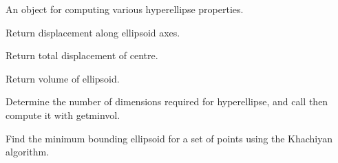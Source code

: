 \documentclass[a4paper,10pt,openany, oneside]{sphinxmanual}
\begin{document}
\begin{fulllineitems}
\label{api_reference:distellipsoid.ellipsoid.Ellipsoid}
An object for computing various hyperellipse properties.

\begin{fulllineitems}
\label{api_reference:distellipsoid.ellipsoid.Ellipsoid.centreaxes}
Return displacement along ellipsoid axes.

\end{fulllineitems}


\begin{fulllineitems}
\label{api_reference:distellipsoid.ellipsoid.Ellipsoid.centredisp}
Return total displacement of centre.

\end{fulllineitems}


\begin{fulllineitems}
\label{api_reference:distellipsoid.ellipsoid.Ellipsoid.ellipsvol}
Return volume of ellipsoid.

\end{fulllineitems}


\begin{fulllineitems}
\label{api_reference:distellipsoid.ellipsoid.Ellipsoid.findellipsoid}
Determine the number of dimensions required for hyperellipse, and call then compute it with getminvol.

\end{fulllineitems}


\begin{fulllineitems}
\label{api_reference:distellipsoid.ellipsoid.Ellipsoid.getminvol}
Find the minimum bounding ellipsoid for a set of points using the Khachiyan algorithm.


\end{fulllineitems}
\end{fulllineitems}
\end{document}
